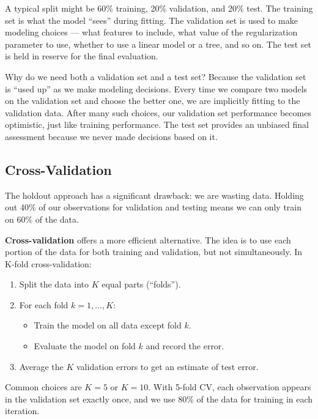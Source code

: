 \documentclass[11pt,a4paper]{article}
\newcommand{\keyword}[1]{\textbf{\textcolor{AccentOrange}{#1}}}
\begin{document}
A typical split might be 60\% training, 20\% validation, and 20\% test. The training set is what the model ``sees'' during fitting. The validation set is used to make modeling choices — what features to include, what value of the regularization parameter to use, whether to use a linear model or a tree, and so on. The test set is held in reserve for the final evaluation.

Why do we need both a validation set and a test set? Because the validation set is ``used up'' as we make modeling decisions. Every time we compare two models on the validation set and choose the better one, we are implicitly fitting to the validation data. After many such choices, our validation set performance becomes optimistic, just like training performance. The test set provides an unbiased final assessment because we never made decisions based on it.

\subsection{Cross-Validation}

The holdout approach has a significant drawback: we are wasting data. Holding out 40\% of our observations for validation and testing means we can only train on 60\% of the data.

\keyword{Cross-validation} offers a more efficient alternative. The idea is to use each portion of the data for both training and validation, but not simultaneously. In K-fold cross-validation:

\begin{enumerate}
    \item Split the data into $K$ equal parts (``folds'').
    \item For each fold $k = 1, \ldots, K$:
    \begin{itemize}
        \item Train the model on all data except fold $k$.
        \item Evaluate the model on fold $k$ and record the error.
    \end{itemize}
    \item Average the $K$ validation errors to get an estimate of test error.
\end{enumerate}

Common choices are $K = 5$ or $K = 10$. With 5-fold CV, each observation appears in the validation set exactly once, and we use 80\% of the data for training in each iteration.
\end{document}
